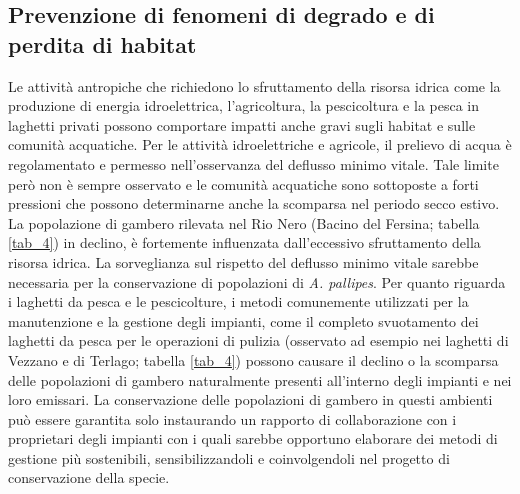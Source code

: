 \documentclass[11pt,a4paper,italian,twoside,openany]{memoir}
\begin{document}
\subsection{Prevenzione di fenomeni di degrado e di perdita di habitat}
Le attività antropiche che richiedono lo sfruttamento della risorsa idrica come la produzione di energia idroelettrica, l'agricoltura, la pescicoltura e la pesca in laghetti privati possono comportare impatti anche gravi sugli habitat e sulle comunità acquatiche. Per le attività idroelettriche e agricole, il prelievo di acqua è regolamentato e permesso nell'osservanza del deflusso minimo vitale. Tale limite però non è sempre osservato e le comunità acquatiche sono sottoposte a forti pressioni che possono determinarne anche la scomparsa nel periodo secco estivo. La popolazione di gambero rilevata nel Rio Nero (Bacino del Fersina; tabella \ref{tab_4}) in declino, è fortemente influenzata dall'eccessivo sfruttamento della risorsa idrica. La sorveglianza sul rispetto del deflusso minimo vitale sarebbe necessaria per la conservazione di popolazioni di \emph{A. pallipes}. Per quanto riguarda i laghetti da pesca e le pescicolture, i metodi comunemente utilizzati per la manutenzione e la gestione degli impianti, come il completo svuotamento dei laghetti da pesca per le operazioni di pulizia (osservato ad esempio nei laghetti di Vezzano e di Terlago; tabella \ref{tab_4}) possono causare il declino o la scomparsa delle popolazioni di gambero naturalmente presenti all'interno degli impianti e nei loro emissari. La conservazione delle popolazioni di gambero in questi ambienti può essere garantita solo instaurando un rapporto di collaborazione con i proprietari degli impianti con i quali sarebbe opportuno elaborare dei metodi di gestione più sostenibili, sensibilizzandoli e coinvolgendoli nel progetto di conservazione della specie. 
\end{document}
